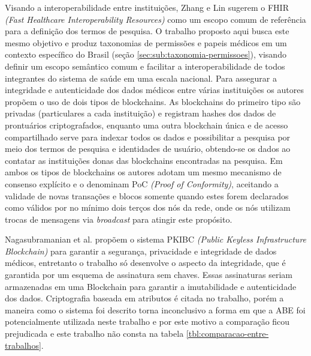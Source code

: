 \documentclass[a4paper,11pt]{article}
\begin{document}
Visando a interoperabilidade entre instituições, Zhang e Lin sugerem o FHIR \emph{(Fast Healthcare Interoperability Resources)} \cite{HL72019} como um escopo comum de referência para a definição dos termos de pesquisa.
O trabalho proposto aqui busca este mesmo objetivo e produz taxonomias de permissões e papeis médicos em um contexto específico do Brasil (seção \ref{sec:sub:taxonomia-permissoes}), visando definir um escopo semântico comum e facilitar a interoperabilidade de todos integrantes do sistema de saúde em uma escala nacional.
Para assegurar a integridade e autenticidade dos dados médicos entre várias instituições os autores propõem o uso de dois tipos de blockchains.
As blockchains do primeiro tipo são privadas (particulares a cada instituição) e registram hashes dos dados de prontuários criptografados, enquanto uma outra blockchain única e de acesso compartilhado serve para indexar todos os dados e possibilitar a pesquisa por meio dos termos de pesquisa e identidades de usuário, obtendo-se os dados ao contatar as instituições donas das blockchains encontradas na pesquisa.
Em ambos os tipos de blockchains os autores adotam um mesmo mecanismo de consenso explícito e o denominam PoC \emph{(Proof of Conformity)}, aceitando a validade de novas transações e blocos somente quando estes forem declarados como válidos por no mínimo dois terços dos nós da rede, onde os nós utilizam trocas de mensagens via \emph{broadcast} para atingir este propósito.

Nagasubramanian et al. \cite{Nagasubramanian2020} propõem o sistema PKIBC \emph{(Public Keyless Infrastructure Blockchain)} para garantir a segurança, privacidade e integridade de dados médicos, entretanto o trabalho só desenvolve o aspecto da integridade, que é garantida por um esquema de assinatura sem chaves.
Essas assinaturas seriam armazenadas em uma Blockchain para garantir a imutabilidade e autenticidade dos dados.
Criptografia baseada em atributos é citada no trabalho, porém a maneira como o sistema foi descrito torna inconclusivo a forma em que a ABE foi potencialmente utilizada neste trabalho e por este motivo a comparação ficou prejudicada e este trabalho não consta na tabela \ref{tbl:comparacao-entre-trabalhos}.
\end{document}
